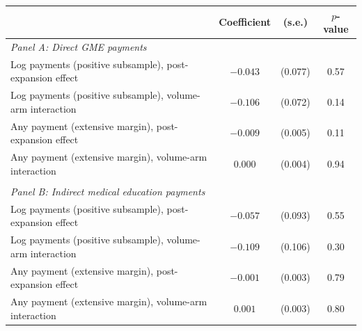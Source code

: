 \begin{tabular}{lccc}
\toprule
 & Coefficient & (s.e.) & $p$-value \\
\midrule
\multicolumn{4}{l}{\textit{Panel A: Direct GME payments}} \\
\midrule
\quad Log payments (positive subsample), post-expansion effect & $-0.043$ & (0.077) & 0.57 \\
\quad Log payments (positive subsample), volume-arm interaction & $-0.106$ & (0.072) & 0.14 \\
\quad Any payment (extensive margin), post-expansion effect & $-0.009$ & (0.005) & 0.11 \\
\quad Any payment (extensive margin), volume-arm interaction & $0.000$ & (0.004) & 0.94 \\
\\[0.5em]
\multicolumn{4}{l}{\textit{Panel B: Indirect medical education payments}} \\
\midrule
\quad Log payments (positive subsample), post-expansion effect & $-0.057$ & (0.093) & 0.55 \\
\quad Log payments (positive subsample), volume-arm interaction & $-0.109$ & (0.106) & 0.30 \\
\quad Any payment (extensive margin), post-expansion effect & $-0.001$ & (0.003) & 0.79 \\
\quad Any payment (extensive margin), volume-arm interaction & $0.001$ & (0.003) & 0.80 \\
\bottomrule
\end{tabular}
